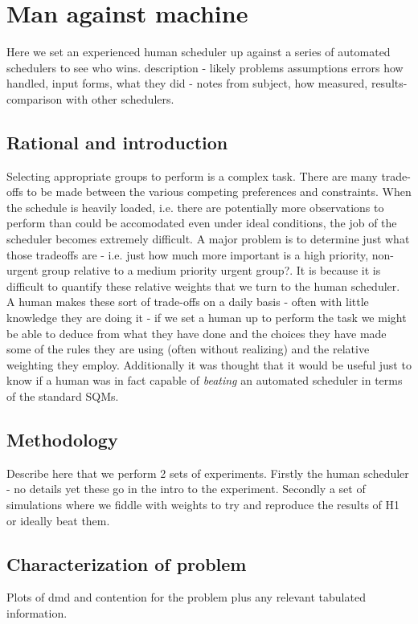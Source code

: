 \section{Man against machine}
\label{sect:mam_study}
Here we set an experienced human scheduler up against a series of automated schedulers to see who wins.
description - likely problems assumptions errors how handled, input forms, what they did - notes from subject, how measured, results-comparison with other schedulers.

\subsection{Rational and introduction}
Selecting appropriate groups to perform is a complex task. There are many trade-offs to be made between the various competing preferences and constraints. When the schedule is heavily loaded, i.e. there are potentially more observations to perform than could be accomodated even under ideal conditions, the job of the scheduler becomes extremely difficult. A major problem is to determine just what those tradeoffs are - i.e. just how much more important is a high priority, non-urgent group relative to a medium priority urgent group?. It is because it is difficult to quantify these relative weights that we turn to the human scheduler. A human makes these sort of trade-offs on a daily basis - often with little knowledge they are doing it - if we set a human up to perform the task we might be able to deduce from what they have done and the choices they have made some of the rules they are using (often without realizing) and the relative weighting they employ. Additionally it was thought that it would be useful just to know if a human was in fact capable of \emph{beating} an automated scheduler in terms of the standard SQMs.

\subsection{Methodology}
Describe here that we perform 2 sets of experiments. Firstly the human scheduler - no details yet these go in the intro to the experiment. Secondly a set of simulations where we fiddle with weights to try and reproduce the results of H1 or ideally beat them.


\subsection{Characterization of problem}
Plots of dmd and contention for the problem plus any relevant tabulated information.

